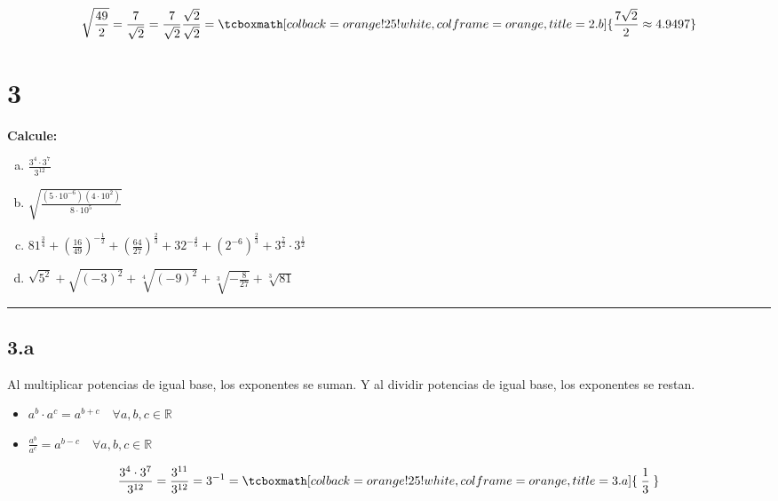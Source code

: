 \documentclass{article}
\newcommand{\hresult}[2]{\tcboxmath[colback=orange!25!white,colframe=orange, title=#1] {#2} }
\newcommand{\hresulte}[3]{\tcboxmath[colback=orange!25!white,colframe=orange, title=#1] { \hspace{#3} #2 \hspace{#3} } }
\begin{document}
\begin{equation}
\sqrt{\frac{49}{2}} = \frac{7}{\sqrt{2}} = \frac{7}{\sqrt{2}} \frac{\sqrt{2}}{\sqrt{2}} = \hresult{2.b} { \frac{7 \sqrt{2}}{2} \approx 4.9497 }
\end{equation}

\section*{3}
\label{sec:3}

\textbf{Calcule:}

\begin{enumerate}[(a)]
\bfseries

\item $ \frac{3^4 \cdot 3^7}{3^{12}} $

\item $\sqrt{ \frac{ (5 \cdot 10^{-6}) (4 \cdot {10}^2) }{8 \cdot {10}^5} }$

\item $ {81}^{\frac{3}{4}} + \left( \frac{16}{49} \right)^{-\frac{1}{2}} + \left( \frac{64}{27} \right)^{\frac{2}{3}} + {32}^{-\frac{4}{5}} + \left( {{2}^{-6}} \right) ^{\frac{2}{3}} + 3^{\frac{7}{2}} \cdot 3^{\frac{1}{2}} $

\item $ \sqrt{5^2} + \sqrt{(-3)^2} + \sqrt[4]{(-9)^2} + \sqrt[3]{-\frac{8}{27}} + \sqrt[3]{81} $

\end{enumerate}
\hrule

\subsection*{3.a}
\label{subsec:3.a}

Al multiplicar potencias de igual base, los exponentes se suman. Y al dividir potencias de igual base, los exponentes se restan.

\begin{itemize}
\item $ a^b \cdot a^c = a^{b + c} \quad \forall a, b, c \in \mathbb{R}$
\item $ \frac{a^b}{a^c} = a^{b - c} \quad \forall a, b, c \in \mathbb{R}$
\end{itemize}

\begin{equation}
\frac{3^4 \cdot 3^7}{3^{12}} = \frac{3^{11}}{3^{12}} = 3^{-1} = \hresulte{3.a} { \frac{1}{3} } {0.25em}
\end{equation}
\end{document}
